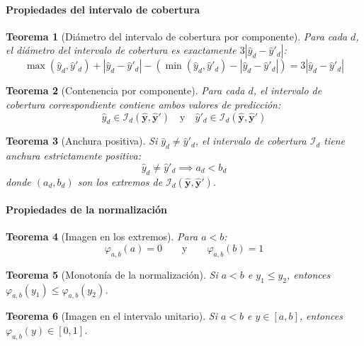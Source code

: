 \documentclass[12pt]{report} %
\newtheorem{theorem}{Teorema}
\begin{document}
\paragraph{Propiedades del intervalo de cobertura}

\begin{theorem}[Diámetro del intervalo de cobertura por componente]
    \label{thm:cov_diameter}
    Para cada $d$, el diámetro del intervalo de cobertura es exactamente $3|\hat{y}_d - \hat{y}'_d|$:
    $$\max(\hat{y}_d, \hat{y}'_d) + |\hat{y}_d - \hat{y}'_d| - \left(\min(\hat{y}_d, \hat{y}'_d) - |\hat{y}_d - \hat{y}'_d|\right) = 3|\hat{y}_d - \hat{y}'_d|$$
\end{theorem}

\begin{theorem}[Contenencia por componente]
    Para cada $d$, el intervalo de cobertura correspondiente contiene ambos valores de predicción:
    $$\hat{y}_d \in \mathcal{I}_d(\hat{\mathbf{y}}, \hat{\mathbf{y}}') \quad \text{y} \quad \hat{y}'_d \in \mathcal{I}_d(\hat{\mathbf{y}}, \hat{\mathbf{y}}')$$
\end{theorem}

\begin{theorem}[Anchura positiva]
    Si $\hat{y}_d \neq \hat{y}'_d$, el intervalo de cobertura $\mathcal{I}_d$ tiene anchura estrictamente positiva:
    $$\hat{y}_d \neq \hat{y}'_d \implies a_d < b_d$$
    donde $(a_d, b_d)$ son los extremos de $\mathcal{I}_d(\hat{\mathbf{y}}, \hat{\mathbf{y}}')$.
\end{theorem}

\paragraph{Propiedades de la normalización}

\begin{theorem}[Imagen en los extremos]
    Para $a < b$:
    $$\varphi_{a,b}(a) = 0 \qquad \text{y} \qquad \varphi_{a,b}(b) = 1$$
\end{theorem}

\begin{theorem}[Monotonía de la normalización]
    Si $a < b$ e $y_1 \leq y_2$, entonces $\varphi_{a,b}(y_1) \leq \varphi_{a,b}(y_2)$.
\end{theorem}

\begin{theorem}[Imagen en el intervalo unitario]
    Si $a < b$ e $y \in [a, b]$, entonces $\varphi_{a,b}(y) \in [0, 1]$.
\end{theorem}
\end{document}
